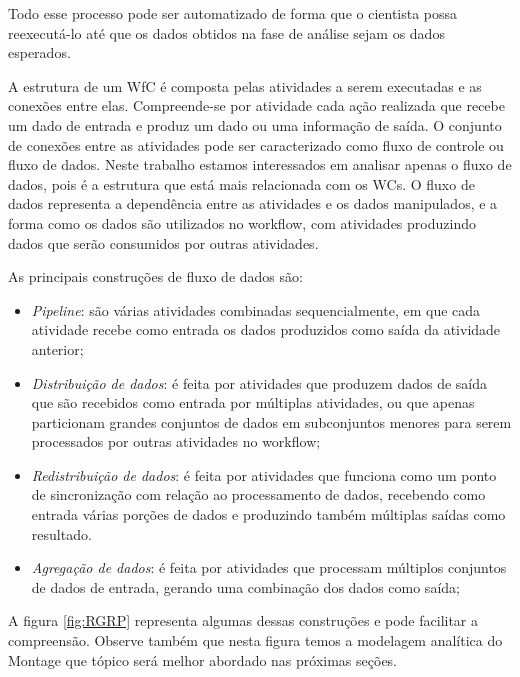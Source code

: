 		Todo esse processo pode ser automatizado de forma que o cientista possa reexecutá-lo até que os dados obtidos na fase de análise sejam os dados esperados. 
		
		A estrutura de um WfC é composta pelas atividades a serem executadas e as conexões entre elas. Compreende-se por atividade cada ação realizada que recebe um dado de entrada e produz um dado ou uma informação de saída. O conjunto de conexões entre as atividades pode ser caracterizado como fluxo de controle ou fluxo de dados. Neste trabalho estamos interessados em analisar apenas o fluxo de dados, pois é a estrutura que está mais relacionada com os WCs. O fluxo de dados representa a dependência entre as atividades e os dados manipulados, e a forma como os dados são utilizados no workflow, com atividades produzindo dados que serão consumidos por outras atividades\cite{Teixeira2013}. 

		As principais construções de fluxo de dados são\cite{Teixeira2013}:
		
	\begin{itemize}
		
		\item \textit{Pipeline}: são várias atividades combinadas sequencialmente, em que cada atividade recebe como entrada os dados produzidos como saída da atividade anterior;

		\item \textit{Distribuição de dados}: é feita por atividades que produzem dados de saída que são recebidos como entrada por múltiplas atividades, ou que apenas particionam grandes conjuntos de dados em subconjuntos menores para serem processados por outras atividades no workflow;
		
		\item \textit{Redistribuição de dados}: é feita por atividades que funciona como um ponto de sincronização com relação ao processamento de dados, recebendo como entrada várias porções de dados e produzindo também múltiplas saídas como resultado.

		\item \textit{Agregação de dados}: é feita por atividades que processam múltiplos conjuntos de dados de entrada, gerando uma combinação dos dados como saída;

	\end{itemize}
		
	A figura \ref{fig:RGRP} representa algumas dessas construções e pode facilitar a compreensão. Observe também que nesta figura temos a modelagem analítica do Montage que tópico será melhor abordado nas próximas seções.
			
